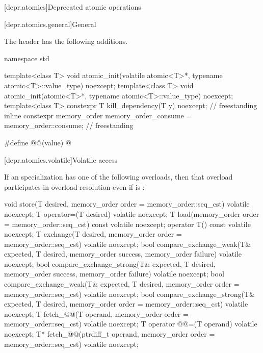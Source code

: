 [depr.atomics]{Deprecated atomic operations}

[depr.atomics.general]{General}

\pnum
The header  has the following additions.

\begin{codeblock}
namespace std {
  template<class T>
    void atomic_init(volatile atomic<T>*, typename atomic<T>::value_type) noexcept;
  template<class T>
    void atomic_init(atomic<T>*, typename atomic<T>::value_type) noexcept;
  template<class T>
    constexpr T kill_dependency(T y) noexcept;                                  // freestanding
  inline constexpr memory_order memory_order_consume = memory_order::consume;   // freestanding

  #define @@(value) @\seebelow@
}
\end{codeblock}

[depr.atomics.volatile]{Volatile access}

\pnum
If an  specialization has one of the following overloads,
then that overload participates in overload resolution
even if  is :
\begin{codeblock}
void store(T desired, memory_order order = memory_order::seq_cst) volatile noexcept;
T operator=(T desired) volatile noexcept;
T load(memory_order order = memory_order::seq_cst) const volatile noexcept;
operator T() const volatile noexcept;
T exchange(T desired, memory_order order = memory_order::seq_cst) volatile noexcept;
bool compare_exchange_weak(T& expected, T desired,
                           memory_order success, memory_order failure) volatile noexcept;
bool compare_exchange_strong(T& expected, T desired,
                             memory_order success, memory_order failure) volatile noexcept;
bool compare_exchange_weak(T& expected, T desired,
                           memory_order order = memory_order::seq_cst) volatile noexcept;
bool compare_exchange_strong(T& expected, T desired,
                             memory_order order = memory_order::seq_cst) volatile noexcept;
T fetch_@@(T operand, memory_order order = memory_order::seq_cst) volatile noexcept;
T operator @@=(T operand) volatile noexcept;
T* fetch_@@(ptrdiff_t operand, memory_order order = memory_order::seq_cst) volatile noexcept;
\end{codeblock}

